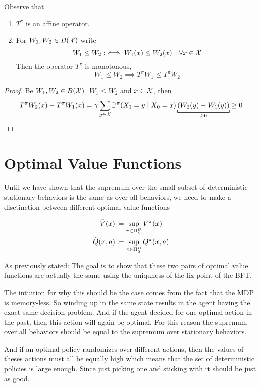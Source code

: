\begin{lemma}\label{properties T^pi} Observe that
	\begin{enumerate}
		\item \(T^\pi\) is an affine operator.
		\item For \(W_1,W_2\in B(\mathcal{X})\) write
		\[
			W_1 \le W_2 :\iff  W_1(x)\le W_2(x) \quad \forall x\in\mathcal{X}
		\]
		Then the operator \(T^\pi\) is monotonous, 
		\[W_1\le W_2 \implies T^\pi W_1\le T^\pi W_2\]
	\end{enumerate}
\end{lemma}

\begin{proof}
 Be \(W_1,W_2\in B(\mathcal{X})\), \(W_1\le W_2\) and \(x\in\mathcal{X}\), then
\[
	T^\pi W_2 (x) - T^\pi W_1(x) 
	= \gamma \sum_{y\in\cX} \Pr^\pi(X_1=y\mid X_0=x) \underbracket[1pt]{
		(W_2(y)-W_1(y))
	}_{\ge 0} \ge 0 \qedhere
\]
\end{proof}

\section{Optimal Value Functions}
Until we have shown that the supremum over the small subset of deterministic stationary behaviors is the same as over all behaviors, we need to make a disctinction between different optimal value functions

\begin{definition}
\begin{align*}
	\tilde{V}(x)&\coloneqq \sup_{\pi\in\Pi_S^D} V^\pi(x)\\
	\tilde{Q}(x,a)&\coloneqq \sup_{\pi\in\Pi_S^D} Q^\pi(x,a)
\end{align*}
\end{definition}

As previously stated: The goal is to show that these two pairs of optimal value functions are actually the same using the uniquness of the fix-point of the BFT. 

The intuition for why this should be the case comes from the fact that the MDP is memory-less. So winding up in the same state results in the agent having the exact same decision problem. And if the agent decided for one optimal action in the past, then this action will again be optimal. For this reason the supremum over all behaviors should be equal to the supremum over stationary behaviors. 

And if an optimal policy randomizes over different actions, then the values of theses actions must all be equally high which means that the set of deterministic policies is large enough. Since just picking one and sticking with it should be just as good.

